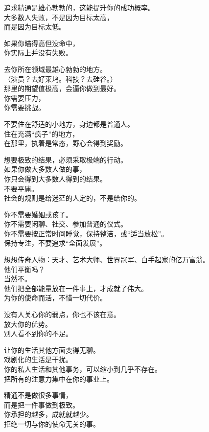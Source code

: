 \documentclass[
]{article}
\begin{document}
追求精通是雄心勃勃的，这能提升你的成功概率。\\
大多数人失败，不是因为目标太高，\\
而是因为目标太低。

如果你瞄得高但没命中，\\
你实际上并没有失败。

去你所在领域最雄心勃勃的地方。\\
（演员？去好莱坞。科技？去硅谷。）\\
那里的期望值极高，会逼你做到最好。\\
你需要压力，\\
你需要挑战。

不要住在舒适的小地方，身边都是普通人。\\
住在充满``疯子''的地方，\\
在那里，执着是常态，野心会得到奖励。

想要极致的结果，必须采取极端的行动。\\
如果你做大多数人做的事，\\
你只会得到大多数人得到的结果。\\
不要平庸。\\
社会的规则是给迷茫的人定的，不是给你的。

你不需要婚姻或孩子。\\
你不需要闲聊、社交、参加普通的仪式。\\
你不需要按正常时间睡觉，保持整洁，或``适当放松''。\\
保持专注，不要追求``全面发展''。

想想传奇人物：天才、艺术大师、世界冠军、白手起家的亿万富翁。\\
他们平衡吗？\\
当然不。\\
他们把全部能量放在一件事上，才成就了伟大。\\
为你的使命而活，不惜一切代价。

没有人关心你的弱点，你也不该在意。\\
放大你的优势。\\
别人看不到你的不足。

让你的生活其他方面变得无聊。\\
戏剧化的生活是干扰。\\
你的私人生活和其他事务，可以缩小到几乎不存在。\\
把所有的注意力集中在你的事业上。

精通不是做很多事情，\\
而是把一件事做到极致。\\
你承担的越多，成就就越少。\\
拒绝一切与你的使命无关的事。
\end{document}
